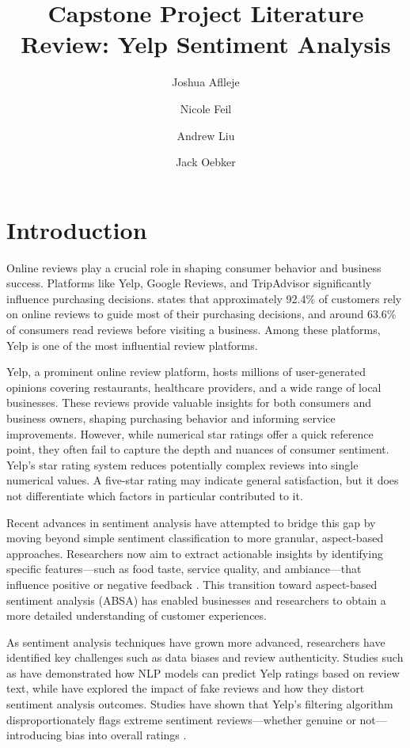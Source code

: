 \documentclass{article}
\title{Capstone Project Literature Review: Yelp Sentiment Analysis}
\author{Joshua Aflleje}
\author{Nicole Feil}
\author{Andrew Liu}
\author{Jack Oebker}
\affil{Arizona State University, Tempe, AZ 85281, USA}
\begin{document}
\maketitle

\section{Introduction}
Online reviews play a crucial role in shaping consumer behavior and business success. Platforms like Yelp, Google Reviews, and TripAdvisor significantly influence purchasing decisions. \citep{reviewtrackers2025} states that approximately 92.4\% of customers rely on online reviews to guide most of their purchasing decisions, and around 63.6\% of consumers read reviews before visiting a business. Among these platforms, Yelp is one of the most influential review platforms. 

Yelp, a prominent online review platform, hosts millions of user-generated opinions covering restaurants, healthcare providers, and a wide range of local businesses. These reviews provide valuable insights for both consumers and business owners, shaping purchasing behavior and informing service improvements. However, while numerical star ratings offer a quick reference point, they often fail to capture the depth and nuances of consumer sentiment. Yelp’s star rating system reduces potentially complex reviews into single numerical values. A five-star rating may indicate general satisfaction, but it does not differentiate which factors in particular contributed to it. 

Recent advances in sentiment analysis have attempted to bridge this gap by moving beyond simple sentiment classification to more granular, aspect-based approaches. Researchers now aim to extract actionable insights by identifying specific features—such as food taste, service quality, and ambiance—that influence positive or negative feedback \citep{HuLiu2004}. This transition toward aspect-based sentiment analysis (ABSA) has enabled businesses and researchers to obtain a more detailed understanding of customer experiences.

As sentiment analysis techniques have grown more advanced, researchers have identified key challenges such as data biases and review authenticity. Studies such as \cite{Liang2018} have demonstrated how NLP models can predict Yelp ratings based on review text, while \cite{Mukherjee2021} have explored the impact of fake reviews and how they distort sentiment analysis outcomes. Studies have shown that Yelp’s filtering algorithm disproportionately flags extreme sentiment reviews—whether genuine or not—introducing bias into overall ratings \cite{Mukherjee2021}.
\end{document}
